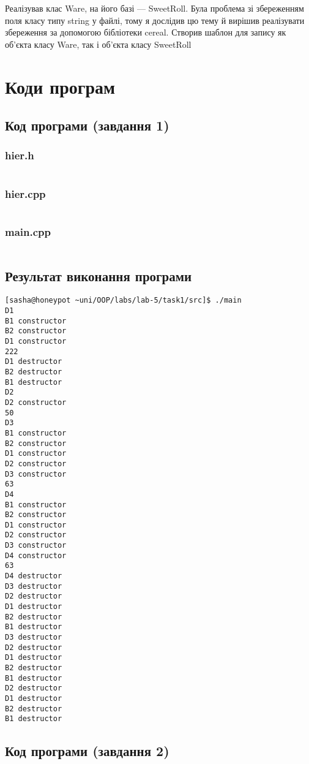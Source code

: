 \documentclass[a4paper, 12pt, oneside]{extarticle}
\begin{document}
Реалізував клас Ware, на його базі --- SweetRoll.
Була проблема зі збереженням поля класу типу string
у файлі, тому я дослідив цю тему й вирішив
реалізувати збереження за допомогою бібліотеки cereal.
Створив шаблон для запису як об'єкта класу Ware, так і об'єкта класу SweetRoll

\section*{Коди програм}

\subsection*{Код програми (завдання 1)}

\subsubsection{hier.h}
\inputminted{c++}{task1/include/hier.h}
\subsubsection{hier.cpp}
\inputminted{c++}{task1/src/hier.cpp}
\subsubsection{main.cpp}
\inputminted{c++}{task1/src/main.cpp}

\subsection*{Результат виконання програми}

\begin{verbatim}
[sasha@honeypot ~uni/OOP/labs/lab-5/task1/src]$ ./main
D1
B1 constructor
B2 constructor
D1 constructor
222
D1 destructor
B2 destructor
B1 destructor
D2
D2 constructor
50
D3
B1 constructor
B2 constructor
D1 constructor
D2 constructor
D3 constructor
63
D4
B1 constructor
B2 constructor
D1 constructor
D2 constructor
D3 constructor
D4 constructor
63
D4 destructor
D3 destructor
D2 destructor
D1 destructor
B2 destructor
B1 destructor
D3 destructor
D2 destructor
D1 destructor
B2 destructor
B1 destructor
D2 destructor
D1 destructor
B2 destructor
B1 destructor
\end{verbatim}

\subsection*{Код програми (завдання 2)}
\end{document}
